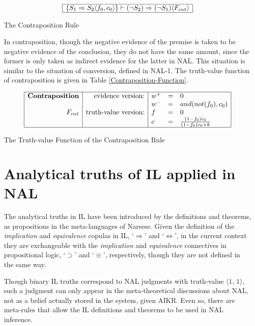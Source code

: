 \begin{table}[htb]
\[\begin{array}{|c|}
\hline
\{S_1 \Rightarrow S_2 \langle  f_0, c_0 \rangle \} \vdash (\neg S_2) \Rightarrow (\neg S_1) \langle F_{cnt}\rangle  \\
\hline
\end{array}\]
\caption{The Contraposition Rule}
\label{Contraposition}
\end{table}

In contraposition, though the negative evidence of the premise is taken to be negative evidence of the conclusion, they do not have the same amount, since the former is only taken as indirect evidence for the latter in NAL. This situation is similar to the situation of conversion, defined in NAL-1.  The truth-value function of contraposition is given in Table \ref{Contraposition-Function}.

\begin{table}[htb]
\[\begin{array}{|r|r|lcl|} \hline
\mbox{\textbf{Contraposition}} & \mbox{evidence version:}    & w^+ & = & 0 \\
								         &					                   & w^- & = & and(not(f_0), c_0) \\
                 F_{cnt} & \mbox{truth-value version:} & f & = & 0 \\
								         &					                   & c & = & \frac{(1 - f_0) c_0}{(1- f_0) c_0 + k} \\
\hline \end{array}\]
\caption{The Truth-value Function of the Contraposition Rule}
\label{Contraposition-Function}
\end{table}


\section{Analytical truths of IL applied in NAL}

The analytical truths in IL have been introduced by the definitions and theorems, as propositions in the meta-languages of Narsese. Given the definition of the \emph{implication} and \emph{equivalence} copulas in IL, `$\Rightarrow$' and `$\Leftrightarrow$', in the current context they are exchangeable with the \emph{implication} and \emph{equivalence} connectives in propositional logic, `$\supset$' and `$\equiv$', respectively, though they are not defined in the same way.

Though binary IL truths correspond to NAL judgments with truth-value \(\langle 1, \, 1\rangle\), such a judgment can only appear in the meta-theoretical discussions about NAL, not as a belief actually stored in the system, given AIKR. Even so, there are meta-rules that allow the IL definitions and theorems to be used in NAL inference.

